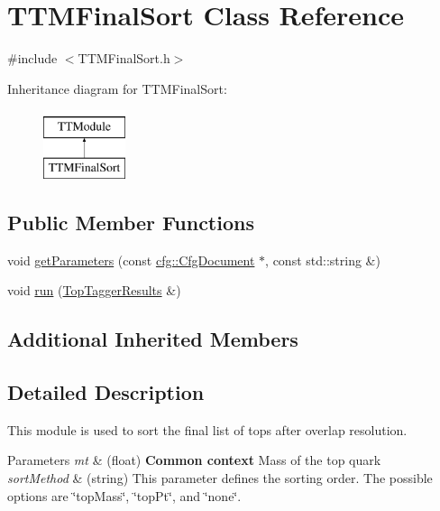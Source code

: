 \hypertarget{classTTMFinalSort}{\section{T\-T\-M\-Final\-Sort Class Reference}
\label{classTTMFinalSort}
}


{\ttfamily \#include $<$T\-T\-M\-Final\-Sort.\-h$>$}

Inheritance diagram for T\-T\-M\-Final\-Sort\-:\begin{figure}[H]
\begin{center}
\leavevmode
\includegraphics[height=2.000000cm]{classTTMFinalSort}
\end{center}
\end{figure}
\subsection*{Public Member Functions}
\begin{DoxyCompactItemize}
\item 
void \hyperlink{classTTMFinalSort_a1d26fb550c790fb08476c3d4eab99cfd}{get\-Parameters} (const \hyperlink{classcfg_1_1CfgDocument}{cfg\-::\-Cfg\-Document} $\ast$, const std\-::string \&)
\item 
void \hyperlink{classTTMFinalSort_ae4a9797de31364e116fe4b99c57c4afd}{run} (\hyperlink{classTopTaggerResults}{Top\-Tagger\-Results} \&)
\end{DoxyCompactItemize}
\subsection*{Additional Inherited Members}


\subsection{Detailed Description}
This module is used to sort the final list of tops after overlap resolution.


\begin{DoxyParams}{Parameters}
{\em mt} & (float) {\bfseries  Common context } Mass of the top quark \\
\hline
{\em sort\-Method} & (string) This parameter defines the sorting order. The possible options are \char`\"{}top\-Mass\char`\"{}, \char`\"{}top\-Pt\char`\"{}, and \char`\"{}none\char`\"{}. \\
\hline
\end{DoxyParams}


